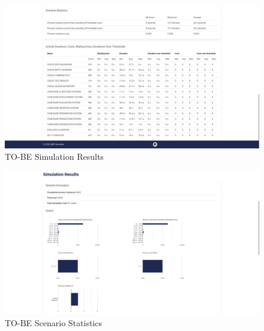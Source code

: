\begin{figure}[H]
    \centering
    \includegraphics[width=1\textwidth]{figures/TO-BE Simulation Results.png}
    \caption{TO-BE Simulation Results}
    \label{fig:to_be_simulation_results}
\end{figure}

\begin{figure}[H]
    \centering
    \includegraphics[width=1\textwidth]{figures/TO-BE Scenario Statistics.png}
    \caption{TO-BE Scenario Statistics}
    \label{fig:to_be_scenario_Statistics}
\end{figure}

